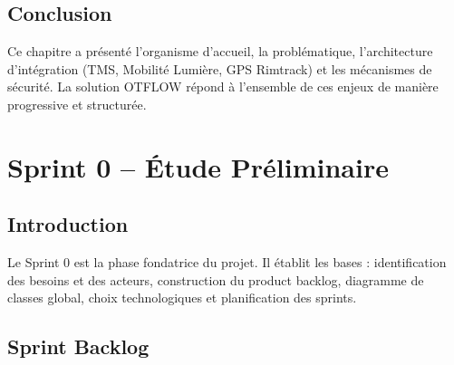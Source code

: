 \documentclass[12pt,a4paper,oneside]{report}
\begin{document}
\section{Conclusion}
Ce chapitre a présenté l'organisme d'accueil, la problématique, l'architecture d'intégration (TMS, Mobilité Lumière, GPS Rimtrack) et les mécanismes de sécurité. La solution OTFLOW répond à l'ensemble de ces enjeux de manière progressive et structurée.

\chapter{Sprint 0 -- Étude Préliminaire}

\section{Introduction}
Le Sprint 0 est la phase fondatrice du projet. Il établit les bases : identification des besoins et des acteurs, construction du product backlog, diagramme de classes global, choix technologiques et planification des sprints.

\section{Sprint Backlog}
\end{document}
